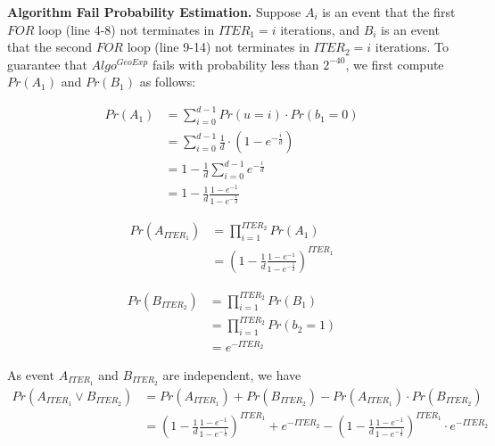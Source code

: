 \textbf{Algorithm Fail Probability Estimation. }
Suppose $A_i$ is an event that the first $FOR$ loop (line 4-8) not terminates in $ITER_1=i$ iterations, and $B_i$ is an event that the second $FOR$ loop (line 9-14) not terminates in $ITER_2=i$ iterations.
To guarantee that $Algo^{GeoExp}$ fails with probability less than $2^{-40}$, we first compute $Pr\left(A_1\right)$ and $Pr\left(B_1\right)$ as follows:



\begin{equation}
    \begin{split}
        Pr\left(A_1\right) &= \sum_{i=0 }^{d-1}Pr\left(u=i\right) \cdot Pr\left(b_1=0\right) \\
        &= \sum_{i=0 }^{d-1}\frac{1}{d} \cdot \left(1-e^{-\frac{i}{d}}\right) \\
        &=1-\frac{1}{d}\sum_{i=0 }^{d-1}e^{-\frac{i}{d}}\\
        &=1-\frac{1}{d}\frac{1-e^{-1}}{1-e^{-\frac{1}{d}}}
    \end{split}
\end{equation}

\begin{equation}
    \begin{split}
        Pr\left(A_{ITER_1}\right) &= \prod_{i=1}^{ITER_2}Pr\left(A_1\right) \\
        &=\left(1-\frac{1}{d}\frac{1-e^{-1}}{1-e^{-\frac{1}{d}}}\right) ^{ITER_1}
    \end{split}
\end{equation}

\begin{equation}
    \begin{split}
        Pr\left(B_{ITER_2}\right) &= \prod_{i=1}^{ITER_2}Pr\left(B_1\right) \\
        &= \prod_{i=1}^{ITER_2}Pr\left(b_2=1\right) \\
        &=e^{- ITER_2 }
    \end{split}
\end{equation}

As event $A_{ITER_1}$ and $B_{ITER_2}$ are independent, we have
\begin{equation}
    \begin{split}
        Pr\left(A_{ITER_1}\lor B_{ITER_2} \right) &= Pr\left(A_{ITER_1} \right)+   Pr\left(B_{ITER_2}\right)-Pr\left(A_{ITER_1} \right)\cdot   Pr\left(B_{ITER_2}\right)\\
        &=\left(1-\frac{1}{d}\frac{1-e^{-1}}{1-e^{-\frac{1}{d}}}\right) ^{ITER_1} + e^{- ITER_2 }-\left(1-\frac{1}{d}\frac{1-e^{-1}}{1-e^{-\frac{1}{d}}}\right) ^{ITER_1} \cdot e^{- ITER_2 }
    \end{split}
\end{equation}

